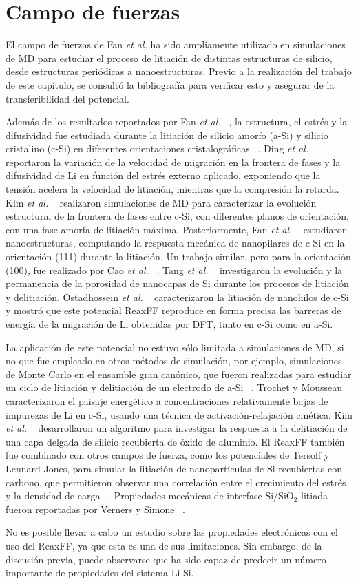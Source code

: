 \section{Campo de fuerzas}

El campo de fuerzas de Fan \textit{et al.} ha sido ampliamente utilizado en 
simulaciones de MD para estudiar el proceso de litiación de distintas estructuras
de silicio, desde estructuras periódicas a nanoestructuras. Previo a la 
realización del trabajo de este capítulo, se consultó la bibliografía para 
verificar esto y asegurar de la transferibilidad del potencial. 

Además de los resultados reportados por Fan \textit{et al.} ~\cite{fan2013}, 
la estructura, el estrés y la difusividad fue estudiada durante la litiación de 
silicio amorfo (a-Si) y silicio cristalino (c-Si) en diferentes orientaciones 
cristalográficas ~\cite{chen2020, kim2015}. Ding \textit{et al.} ~\cite{ding2017} 
reportaron la variación de la velocidad de migración en la frontera de fases y la 
difusividad de Li en función del estrés externo aplicado, exponiendo que la 
tensión acelera la velocidad de litiación, mientras que la compresión la retarda. 
Kim \textit{et al.} ~\cite{kim2014} realizaron simulaciones de MD para caracterizar 
la evolución estructural de la frontera de fases entre c-Si, con diferentes planos 
de orientación, con una fase amorfa de litiación máxima. Posteriormente, Fan 
\textit{et al.} ~\cite{fan2018} estudiaron nanoestructuras, computando la respuesta
mecánica de nanopilares de c-Si en la orientación (111) durante la litiación.
Un trabajo similar, pero para la orientación (100), fue realizado por Cao 
\textit{et al.} ~\cite{cao2019}. Tang \textit{et al.} ~\cite{tang2019} investigaron
la evolución y la permanencia de la porosidad de nanocapas de Si durante los 
procesos de litiación y delitiación. Ostadhossein \textit{et al.} 
~\cite{ostadhossein2015} caracterizaron la litiación de nanohilos de c-Si y mostró
que este potencial ReaxFF reproduce en forma precisa las barreras de energía de 
la migración de Li obtenidas por DFT, tanto en c-Si como en a-Si.

La aplicación de este potencial no estuvo sólo limitada a simulaciones de MD, 
si no que fue empleado en otros métodos de simulación, por ejemplo, simulaciones 
de Monte Carlo en el ensamble gran canónico, que fueron realizadas para estudiar 
un ciclo de litiación y delitiación de un electrodo de a-Si ~\cite{basu2019}. 
Trochet y Mousseau ~\cite{trochet2017} caracterizaron el paisaje energético a 
concentraciones relativamente bajas de impurezas de Li en c-Si, usando una 
técnica de activación-relajación cinética. Kim \textit{et al.} ~\cite{kim2017} 
desarrollaron un algoritmo para investigar la respuesta a la delitiación de una 
capa delgada de silicio recubierta de óxido de aluminio. El ReaxFF también fue 
combinado con otros campos de fuerza, como los potenciales de Tersoff y 
Lennard-Jones, para simular la litiación de nanopartículas de Si recubiertas con 
carbono, que permitieron observar una correlación entre el crecimiento del 
estrés y la densidad de carga ~\cite{zheng2019,zheng2020}. Propiedades mecánicas 
de interfase Si/SiO$_2$ litiada fueron reportadas por Verners y 
Simone ~\cite{verners2019}. 

No es posible llevar a cabo un estudio sobre las propiedades electrónicas con el 
uso del ReaxFF, ya que esta es una de sus limitaciones. Sin embargo, de la 
discusión previa, puede observarse que ha sido capaz de predecir un número 
importante de propiedades del sistema Li-Si.
